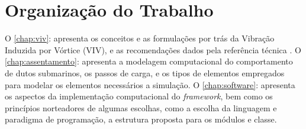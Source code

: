 \section{Organização do Trabalho}

O \autoref{chap:viv}: apresenta os conceitos e as formulações por trás da Vibração Induzida por Vórtice (VIV), e as recomendações dados pela referência técnica . O \autoref{chap:assentamento}: apresenta a modelagem computacional do comportamento de dutos submarinos, os passos de carga, e os tipos de elementos empregados para modelar os elementos necessários a simulação. O \autoref{chap:software}: apresenta os aspectos da implementação computacional do \textit{framework}, bem como os princípios norteadores de algumas escolhas, como a escolha da linguagem e paradigma de programação, a estrutura proposta para os módulos e classe.